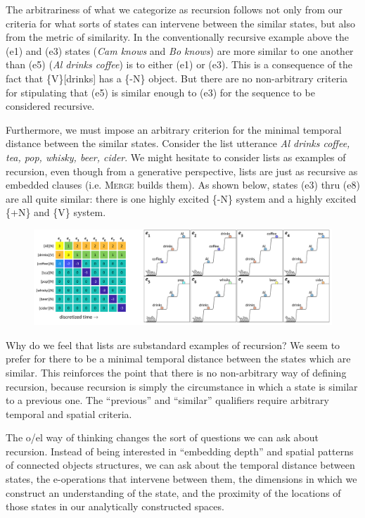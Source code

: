   The arbitrariness of what we categorize as recursion follows not only from our criteria for what sorts of states can intervene between the similar states, but also from the metric of similarity. In the conventionally recursive example above the (e1) and (e3) states (\textit{Cam knows} and \textit{Bo knows}) are more similar to one another than (e5) (\textit{Al drinks coffee}) is to either (e1) or (e3). This is a consequence of the fact that \{V\}[drinks] has a \{-N\} object. But there are no non-arbitrary criteria for stipulating that (e5) is similar enough to (e3) for the sequence to be considered recursive.

  Furthermore, we must impose an arbitrary criterion for the minimal temporal distance between the similar states. Consider the list utterance \textit{Al drinks coffee, tea, pop, whisky, beer, cider}. We might hesitate to consider lists as examples of recursion, even though from a generative perspective, lists are just as recursive as embedded clauses (i.e. \textsc{Merge} builds them). As shown below, states (e3) thru (e8) are all quite similar: there is one highly excited \{-N\} system and a highly excited \{+N\} and \{V\} system.

  
\begin{figure}
\includegraphics[width=\textwidth]{figures/Tilsen-img114.png}
\caption{\missingcaption}
\label{fig:}
\end{figure}
 

  Why do we feel that lists are substandard examples of recursion? We seem to prefer for there to be a minimal temporal distance between the states which are similar. This reinforces the point that there is no non-arbitrary way of defining recursion, because recursion is simply the circumstance in which a state is similar to a previous one. The “previous” and “similar” qualifiers require arbitrary temporal and spatial criteria. 

  The o/el way of thinking changes the sort of questions we can ask about recursion. Instead of being interested in “embedding depth” and spatial patterns of connected objects structures, we can ask about the temporal distance between states, the e-operations that intervene between them, the dimensions in which we construct an understanding of the state, and the proximity of the locations of those states in our analytically constructed spaces.

